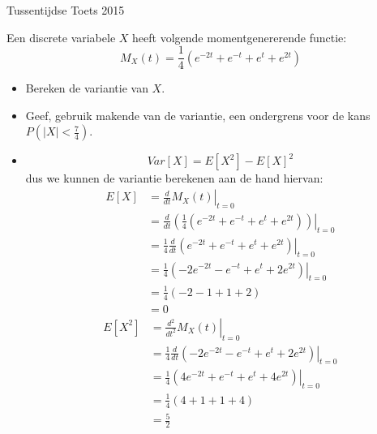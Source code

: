 \documentclass[main.tex]{subfiles}
\begin{document}
\begin{examenvraag}{Tussentijdse Toets 2015}
  \begin{ex-vraag}
    Een discrete variabele $X$ heeft volgende momentgenererende functie:
    \[ M_{X}(t) = \frac{1}{4}\left( e^{-2t} + e^{-t} + e^{t} + e^{2t} \right) \]
    \begin{itemize}
    \item Bereken de variantie van $X$.
    \item Geef, gebruik makende van de variantie, een ondergrens voor de kans $P(|X| < \frac{7}{4})$.
    \end{itemize}

  \end{ex-vraag}

  \begin{ex-antwoord}
    \begin{itemize}
    \item {}
      \[ Var[X] = E[X^{2}] - E[X]^{2} \]
       dus we kunnen de variantie berekenen aan de hand hiervan:
      \begin{align*}
        E[X]
        &= \left.\frac{d}{dt}M_{X}(t)\right|_{t=0}\\
        &= \left.\frac{d}{dt}\left(\frac{1}{4}\left( e^{-2t} + e^{-t} + e^{t} + e^{2t} \right)\right)\right|_{t=0}\\
        &= \frac{1}{4}\left.\frac{d}{dt}\left(e^{-2t} + e^{-t} + e^{t} + e^{2t}\right)\right|_{t=0}\\
        &= \frac{1}{4}\left.\left(-2e^{-2t} -e^{-t} + e^{t} + 2e^{2t}\right)\right|_{t=0}\\
        &= \frac{1}{4}\left(-2-1+1+2\right) \\
        &= 0
      \end{align*}
      \begin{align*}
        E[X^{2}]
        &= \left.\frac{d^{2}}{dt^{2}}M_{X}(t)\right|_{t=0}\\
        &= \frac{1}{4}\left.\frac{d}{dt}\left( -2e^{-2t} - e^{-t} + e^{t} + 2e^{2t} \right)\right|_{t=0}\\
        &= \frac{1}{4}\left.\left( 4e^{-2t} + e^{-t} + e^{t} + 4e^{2t} \right)\right|_{t=0}\\
        &= \frac{1}{4}\left( 4+1+1+4 \right)\\
        &= \frac{5}{2}
      \end{align*}

\end{itemize}
\end{ex-antwoord}
\end{examenvraag}
\end{document}
